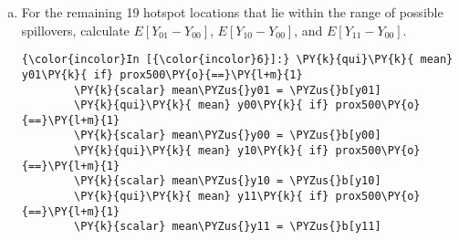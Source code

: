 \documentclass[11pt,notitlepage]{article}\usepackage[]{graphicx}\usepackage[]{color}
\makeatletter
\newenvironment{kframe}{%
 \def\at@end@of@kframe{}%
 \ifinner\ifhmode%
  \def\at@end@of@kframe{\end{minipage}}%
  \begin{minipage}{\columnwidth}%
 \fi\fi%
 \def\FrameCommand##1{\hskip\@totalleftmargin \hskip-\fboxsep
 \colorbox{shadecolor}{##1}\hskip-\fboxsep
     \hskip-\linewidth \hskip-\@totalleftmargin \hskip\columnwidth}%
 \MakeFramed {\advance\hsize-\width
   \@totalleftmargin\z@ \linewidth\hsize
   \@setminipage}}%
 {\par\unskip\endMakeFramed%
 \at@end@of@kframe}
\newenvironment{knitrout}{}{} %
\makeatother
\begin{document}
\begin{enumerate}[a)]
\begin{knitrout}
\begin{kframe}
    \begin{Verbatim}[commandchars=\\\{\}]
{\color{incolor}In [{\color{incolor}4}]:} \PY{k}{qui}\PY{k}{ mean} y\PY{k}{ if} prox500\PY{o}{==}\PY{l+m}{0} \PY{o}{\PYZam{}} assignment \PY{o}{==}\PY{l+m}{1}
        \PY{k}{scalar} mean\PYZus{}y = \PYZus{}b[y]
        \PY{k}{qui}\PY{k}{ mean} y00\PY{k}{ if} prox500\PY{o}{==}\PY{l+m}{0} \PY{o}{\PYZam{}} assignment\PY{o}{==}\PY{l+m}{0}
        \PY{k}{scalar} mean\PYZus{}y00\PYZus{}0 = \PYZus{}b[y00]
        \PY{k}{scalar} ate\PYZus{}hat = mean\PYZus{}y \PY{o}{\PYZhy{}} mean\PYZus{}y00\PYZus{}0
\end{Verbatim}

    \begin{Verbatim}[commandchars=\\\{\}]
{\color{incolor}In [{\color{incolor}5}]:} \PY{k}{disp} ate\PYZus{}hat
\end{Verbatim}

    \begin{Verbatim}[commandchars=\\\{\}]
3.3333333
    \end{Verbatim}
\end{kframe}
\end{knitrout}
The true ATE for the observations that lie outside the range of possibile spillovers is -5. The estimated ATE using the observed random assignment is 3.33.

\item For the remaining 19 hotspot locations that lie within the range of possible spillovers, calculate $E[Y_{01} - Y_{00}]$, $E[Y_{10} - Y_{00}]$, and $E[Y_{11} - Y_{00}]$.
\begin{knitrout}
\color{fgcolor}\begin{kframe}
    \begin{Verbatim}[commandchars=\\\{\}]
{\color{incolor}In [{\color{incolor}6}]:} \PY{k}{qui}\PY{k}{ mean} y01\PY{k}{ if} prox500\PY{o}{==}\PY{l+m}{1}
        \PY{k}{scalar} mean\PYZus{}y01 = \PYZus{}b[y01]
        \PY{k}{qui}\PY{k}{ mean} y00\PY{k}{ if} prox500\PY{o}{==}\PY{l+m}{1}
        \PY{k}{scalar} mean\PYZus{}y00 = \PYZus{}b[y00]
        \PY{k}{qui}\PY{k}{ mean} y10\PY{k}{ if} prox500\PY{o}{==}\PY{l+m}{1}
        \PY{k}{scalar} mean\PYZus{}y10 = \PYZus{}b[y10]
        \PY{k}{qui}\PY{k}{ mean} y11\PY{k}{ if} prox500\PY{o}{==}\PY{l+m}{1}
        \PY{k}{scalar} mean\PYZus{}y11 = \PYZus{}b[y11]
\end{Verbatim}


\end{kframe}
\end{knitrout}
\end{enumerate}
\end{document}

